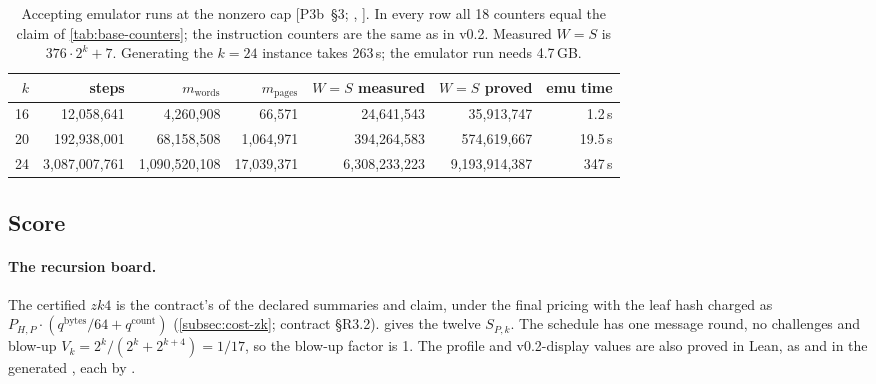 \begin{table}[t]
\centering\footnotesize
\setlength{\tabcolsep}{4pt}
\begin{tabular}{@{}rrrrrrr@{}}
\toprule
$k$ & steps & $m_{\mathrm{words}}$ & $m_{\mathrm{pages}}$ & $W=S$ measured & $W=S$ proved & emu time \\
\midrule
16 & 12{,}058{,}641 & 4{,}260{,}908 & 66{,}571 & 24{,}641{,}543 & 35{,}913{,}747 & 1.2\,s \\
20 & 192{,}938{,}001 & 68{,}158{,}508 & 1{,}064{,}971 & 394{,}264{,}583 & 574{,}619{,}667 & 19.5\,s \\
24 & 3{,}087{,}007{,}761 & 1{,}090{,}520{,}108 & 17{,}039{,}371 & 6{,}308{,}233{,}223 & 9{,}193{,}914{,}387 & 347\,s \\
\bottomrule
\end{tabular}
\caption{Accepting emulator runs at the nonzero cap [P3b~§3; ,
]. In every row all 18 counters equal the claim of \cref{tab:base-counters};
the instruction counters are the same as in v0.2. Measured $W=S$ is $376\cdot2^k+7$. Generating the
$k=24$ instance takes 263\,s; the emulator run needs 4.7\,GB.}\label{tab:base-emu}
\end{table}

\subsection{Score}\label{subsec:base-score}

\paragraph{The recursion board.} The certified $\mathit{zk4}$ is the contract's  of the
declared summaries and claim, under the final pricing with the leaf hash charged as
$P_{H,P}\cdot(q^{\mathrm{bytes}}/64+q^{\mathrm{count}})$ (\cref{subsec:cost-zk}; contract §R3.2).
 gives the twelve $S_{P,k}$. The schedule has one message round, no
challenges and blow-up $V_k=2^k/(2^k+2^{k+4})=1/17$, so the blow-up factor is 1. The profile and
v0.2-display values are also proved in Lean, as  and  in the
generated , each by .


